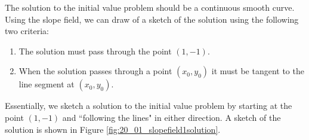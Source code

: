 
{The solution to the initial value problem should be a continuous smooth curve.  Using the slope field, we can draw of a sketch of the solution using the following two criteria:

\begin{enumerate}
\item The solution must pass through the point $(1,-1)$.
\item When the solution passes through a point $(x_0,y_0)$ it must be tangent to the line segment at $(x_0,y_0)$.
\end{enumerate}
Essentially, we sketch a solution to the initial value problem by starting at the point $(1,-1)$ and ``following the lines" in either direction.  A sketch of the solution is shown in Figure \ref{fig:20_01_slopefield1solution}.
}\\





